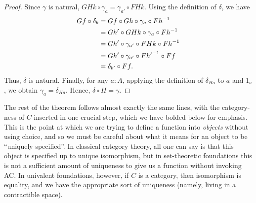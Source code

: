 \begin{proof}
  Since $\gamma$ is natural, $GHk\circ \gamma_a = \gamma_{a'} \circ FHk$.
  Using the definition of $\delta$, we have
  \begin{align*}
    Gf \circ \delta_b
    &= Gf \circ Gh \circ \gamma_a \circ {Fh}^{-1}\\
    &= Gh' \circ GHk\circ \gamma_a \circ {Fh}^{-1}\\
    &= Gh' \circ \gamma_{a'} \circ FHk \circ {Fh}^{-1}\\
    &= Gh' \circ \gamma_{a'} \circ {Fh'}^{-1} \circ Ff\\
    &= \delta_{b'} \circ Ff.
  \end{align*}
  Thus, $\delta$ is natural.
  Finally, for any $a:A$, applying the definition of $\delta_{Ha}$ to $a$ and $1_a$, we obtain $\gamma_a = \delta_{Ha}$.
  Hence, $\delta \circ H = \gamma$.
\end{proof}

The rest of the theorem follows almost exactly the same lines, with the category-ness of $C$ inserted in one crucial step, which we have bolded below for emphasis.
This is the point at which we are trying to define a function into \emph{objects} without using choice, and so we must be careful about what it means for an object to be ``uniquely specified''.
In classical category theory, all one can say is that this object is specified up to unique isomorphism, but in set-theoretic foundations this is not a sufficient amount of uniqueness to give us a function without invoking AC.
In univalent foundations, however, if $C$ is a category, then isomorphism is equality, and we have the appropriate sort of uniqueness (namely, living in a contractible space).

